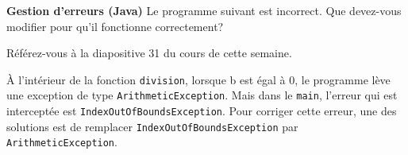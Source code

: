\begin{Exercice}[5 minutes] \textbf{Gestion d'erreurs (Java)} 
    Le programme suivant est incorrect. Que devez-vous modifier pour qu'il fonctionne correctement?
    \\
    \begin{conseil}
        Référez-vous à la diapositive 31 du cours de cette semaine.           
     \end{conseil}
    
     
     \begin{solution}
        À l'intérieur de la fonction \lstinline{division}, lorsque b est égal à 0, le programme lève une exception de type \lstinline{ArithmeticException}. Mais dans le \lstinline{main}, l'erreur qui est interceptée est \lstinline{IndexOutOfBoundsException}. Pour corriger cette erreur, une des solutions est de remplacer \lstinline{IndexOutOfBoundsException} par \lstinline{ArithmeticException}.
     \end{solution}   
 \end{Exercice}

